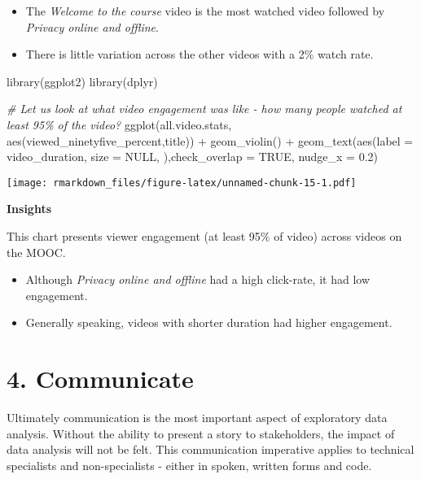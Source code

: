 \documentclass[
]{article}
\newenvironment{Shaded}{\begin{snugshade}}{\end{snugshade}}
\newcommand{\AttributeTok}[1]{\textcolor[rgb]{0.77,0.63,0.00}{#1}}
\newcommand{\CommentTok}[1]{\textcolor[rgb]{0.56,0.35,0.01}{\textit{#1}}}
\newcommand{\ConstantTok}[1]{\textcolor[rgb]{0.00,0.00,0.00}{#1}}
\newcommand{\FloatTok}[1]{\textcolor[rgb]{0.00,0.00,0.81}{#1}}
\newcommand{\FunctionTok}[1]{\textcolor[rgb]{0.00,0.00,0.00}{#1}}
\newcommand{\NormalTok}[1]{#1}
\newcommand{\SpecialCharTok}[1]{\textcolor[rgb]{0.00,0.00,0.00}{#1}}
\begin{document}
\begin{itemize}
\item
  The \emph{Welcome to the course} video is the most watched video
  followed by \emph{Privacy online and offline}.
\item
  There is little variation across the other videos with a 2\% watch
  rate.
\end{itemize}

\begin{Shaded}
\begin{Highlighting}[]
\FunctionTok{library}\NormalTok{(ggplot2)}
\FunctionTok{library}\NormalTok{(dplyr)}

\CommentTok{\# Let us look at what video engagement was like {-} how many people watched at least 95\% of the video?}
\FunctionTok{ggplot}\NormalTok{(all.video.stats, }\FunctionTok{aes}\NormalTok{(viewed\_ninetyfive\_percent,title)) }\SpecialCharTok{+} \FunctionTok{geom\_violin}\NormalTok{()  }\SpecialCharTok{+} \FunctionTok{geom\_text}\NormalTok{(}\FunctionTok{aes}\NormalTok{(}\AttributeTok{label =}\NormalTok{ video\_duration, }\AttributeTok{size =} \ConstantTok{NULL}\NormalTok{, ),}\AttributeTok{check\_overlap =} \ConstantTok{TRUE}\NormalTok{, }\AttributeTok{nudge\_x =} \FloatTok{0.2}\NormalTok{)}
\end{Highlighting}
\end{Shaded}

\texttt{[image: rmarkdown\_files/figure-latex/unnamed-chunk-15-1.pdf]}

\textbf{Insights}

This chart presents viewer engagement (at least 95\% of video) across
videos on the MOOC.

\begin{itemize}
\item
  Although \emph{Privacy online and offline} had a high click-rate, it
  had low engagement.
\item
  Generally speaking, videos with shorter duration had higher
  engagement.
\end{itemize}

\newpage

\hypertarget{communicate}{%
\section{4. Communicate}\label{communicate}}

Ultimately communication is the most important aspect of exploratory
data analysis. Without the ability to present a story to stakeholders,
the impact of data analysis will not be felt. This communication
imperative applies to technical specialists and non-specialists - either
in spoken, written forms and code.
\end{document}
